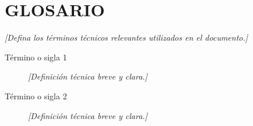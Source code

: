 \clearpage
\chapter*{GLOSARIO}

\noindent\textit{[Defina los términos técnicos relevantes utilizados en el documento.]}

\begin{description}
  \item[Término o sigla 1] \textit{[Definición técnica breve y clara.]}
  \item[Término o sigla 2] \textit{[Definición técnica breve y clara.]}
\end{description}